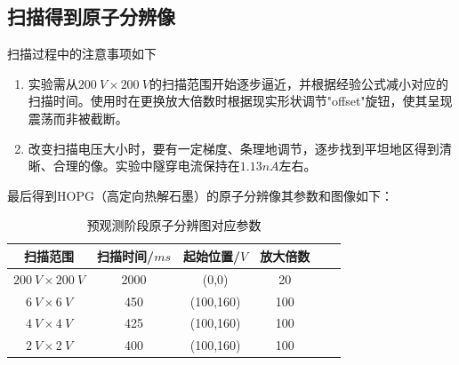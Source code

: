 \documentclass[aps,pre,12pt,preprint,onecolumn,showpacs,showkeys]{revtex4-1}
\begin{document}
\subsection{扫描得到原子分辨像}
扫描过程中的注意事项如下
\begin{enumerate}
    \item 实验需从$200\ \si{V}\times200\ \si{V}$的扫描范围开始逐步逼近，并根据经验公式减小对应的扫描时间。使用时在更换放大倍数时根据现实形状调节"offset"旋钮，使其呈现震荡而非被截断。
    \item 改变扫描电压大小时，要有一定梯度、条理地调节，逐步找到平坦地区得到清晰、合理的像。实验中隧穿电流保持在$1.13\si{nA}$左右。
\end{enumerate}
最后得到HOPG（高定向热解石墨）的原子分辨像其参数和图像如下：
\begin{table}[h]
	\caption{预观测阶段原子分辨图对应参数}
	\begin{ruledtabular}
		\begin{tabular}{cccccc}
			
			扫描范围 &  扫描时间/$\si{ms}$  & 起始位置/$\si{V}$ & 放大倍数\\
			\hline
            $200\ \si{V} \times200\ \si{V}$ & 2000 & (0,0) & 20\\
            $6\ \si{V} \times6\ \si{V}$ & 450 & (100,160) & 100\\
            $4\ \si{V} \times4\ \si{V}$ & 425 & (100,160) & 100\\
            $2\ \si{V} \times2\ \si{V}$ & 400 & (100,160) & 100\\

			
		\end{tabular}
	\end{ruledtabular}
	\label{tab:4}
\end{table}
\end{document}
